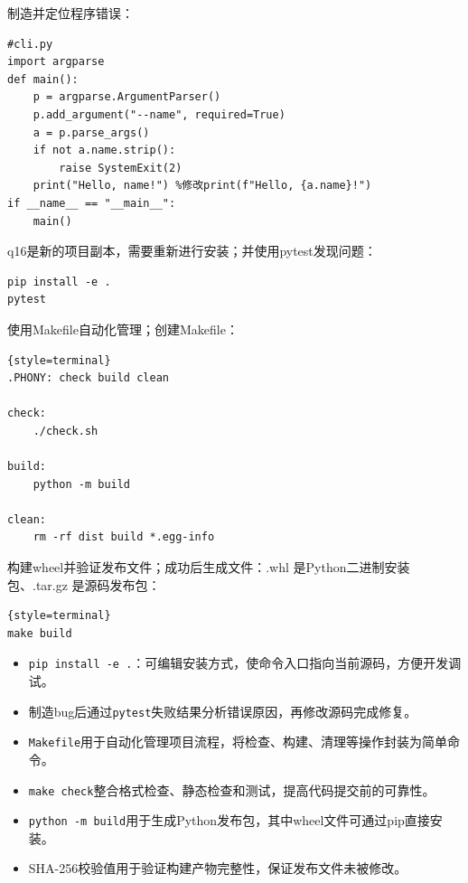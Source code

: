 \documentclass[UTF8,a4paper,11pt]{ctexart}
\begin{document}
制造并定位程序错误：

\begin{lstlisting}[style=terminal] 
#cli.py
import argparse
def main():
    p = argparse.ArgumentParser()
    p.add_argument("--name", required=True)
    a = p.parse_args()
    if not a.name.strip():
        raise SystemExit(2)
    print("Hello, name!") %修改print(f"Hello, {a.name}!")
if __name__ == "__main__":
    main()
\end{lstlisting}

q16是新的项目副本，需要重新进行安装；并使用pytest发现问题：

\begin{lstlisting}[style=terminal] 
pip install -e .
pytest
\end{lstlisting}

使用Makefile自动化管理；创建Makefile：

\begin{lstlisting}{style=terminal}
.PHONY: check build clean

check:
	./check.sh

build:
	python -m build

clean:
	rm -rf dist build *.egg-info
\end{lstlisting}

构建wheel并验证发布文件；成功后生成文件：.whl 是Python二进制安装包、.tar.gz 是源码发布包：
\begin{lstlisting}{style=terminal}
make build
\end{lstlisting}



\begin{itemize}[leftmargin=2em,itemsep=0.2em,topsep=0.3em]
  \small
  \item \texttt{pip install -e .}：可编辑安装方式，使命令入口指向当前源码，方便开发调试。
  \item 制造bug后通过\texttt{pytest}失败结果分析错误原因，再修改源码完成修复。
  \item \texttt{Makefile}用于自动化管理项目流程，将检查、构建、清理等操作封装为简单命令。
  \item \texttt{make check}整合格式检查、静态检查和测试，提高代码提交前的可靠性。
  \item \texttt{python -m build}用于生成Python发布包，其中wheel文件可通过pip直接安装。
  \item SHA-256校验值用于验证构建产物完整性，保证发布文件未被修改。
\end{itemize}
\end{document}
